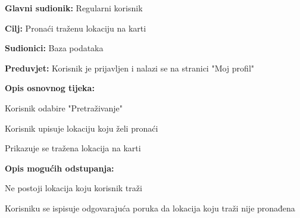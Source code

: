 					\noindent {}
					\begin{packed_item}
	
						\item \textbf{Glavni sudionik: }Regularni korisnik
						\item  \textbf{Cilj:} Pronaći traženu lokaciju na karti
						\item  \textbf{Sudionici:} Baza podataka
						\item  \textbf{Preduvjet:} Korisnik je prijavljen i nalazi se na stranici "Moj profil"
						\item  \textbf{Opis osnovnog tijeka:}
						
						\item[] \begin{packed_enum}
	
	                        \item Korisnik odabire "Pretraživanje"
							\item Korisnik upisuje lokaciju koju želi pronaći
							\item Prikazuje se tražena lokacija na karti

						\end{packed_enum}
						
						\item  \textbf{Opis mogućih odstupanja:}
						\item[] \begin{packed_item}
	
							\item[14.a] Ne postoji lokacija koju korisnik traži
							\item[] \begin{packed_enum}
								\item Korisniku se ispisuje odgovarajuća poruka da lokacija koju traži nije pronađena
							\end{packed_enum}
						\end{packed_item}
						
					\end{packed_item}
					

